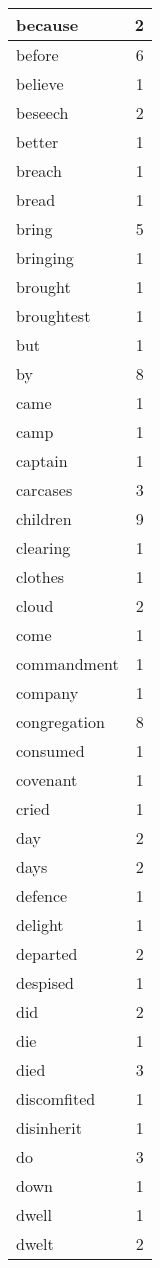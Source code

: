 \begin{center}
\begin{longtable}{l|r}
because & 2 \\ \hline
before & 6 \\ \hline
believe & 1 \\ \hline
beseech & 2 \\ \hline
better & 1 \\ \hline
breach & 1 \\ \hline
bread & 1 \\ \hline
bring & 5 \\ \hline
bringing & 1 \\ \hline
brought & 1 \\ \hline
broughtest & 1 \\ \hline
but & 1 \\ \hline
by & 8 \\ \hline
came & 1 \\ \hline
camp & 1 \\ \hline
captain & 1 \\ \hline
carcases & 3 \\ \hline
children & 9 \\ \hline
clearing & 1 \\ \hline
clothes & 1 \\ \hline
cloud & 2 \\ \hline
come & 1 \\ \hline
commandment & 1 \\ \hline
company & 1 \\ \hline
congregation & 8 \\ \hline
consumed & 1 \\ \hline
covenant & 1 \\ \hline
cried & 1 \\ \hline
day & 2 \\ \hline
days & 2 \\ \hline
defence & 1 \\ \hline
delight & 1 \\ \hline
departed & 2 \\ \hline
despised & 1 \\ \hline
did & 2 \\ \hline
die & 1 \\ \hline
died & 3 \\ \hline
discomfited & 1 \\ \hline
disinherit & 1 \\ \hline
do & 3 \\ \hline
down & 1 \\ \hline
dwell & 1 \\ \hline
dwelt & 2 \\ \hline

\end{longtable}
\end{center}
